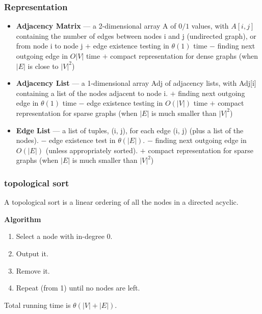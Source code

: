 \subsubsection{Representation}
\begin{itemize}
\item \textbf{Adjacency Matrix} — a 2-dimensional array A of $0/1$ values, with $A[i, j]$
  containing the number of edges between nodes i and j (undirected graph),
  or from node i to node j \newline
  $+$ edge existence testing in $\theta(1)$ time \newline
  $-$ finding next outgoing edge in $O|V|$ time \newline 
  $+$ compact representation for dense graphs (when $|E|$ is close to $|V|^2$)
\item \textbf{Adjacency List} — a 1-dimensional array Adj of adjacency lists, with 
  Adj[i] containing a list of the nodes adjacent to node i. \newline
  $+$ finding next outgoing edge in $\theta(1)$ time \newline
  $-$ edge existence testing in $O (|V|)$ time \newline
  $+$ compact representation for sparse graphs (when $|E|$ is much smaller than $|V|^2$)
\item \textbf{Edge List} — a list of tuples, (i, j), for each edge (i, j) (plus a list of the nodes). \newline
  $-$ edge existence test in $\theta(|E|)$. \newline
  $-$ finding next outgoing edge in $O (|E|)$ (unless appropriately sorted). \newline
  $+$ compact representation for sparse graphs (when $|E|$ is much smaller than $|V|^2$)
\end{itemize}


\newpage

\subsubsection{topological sort}
A topological sort is a linear ordering of all the nodes in a directed acyclic. \newline

\noindent\textbf{Algorithm}
\begin{enumerate}
\item Select a node with in-degree 0.
\item Output it.
\item Remove it.
\item Repeat (from 1) until no nodes are left.
\end{enumerate}
Total running time is $\theta(|V|+|E|)$.

